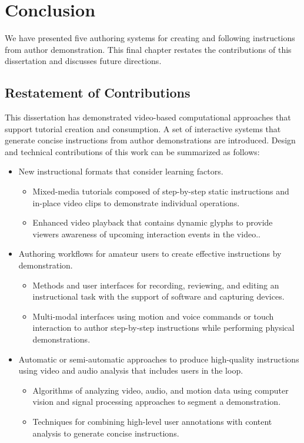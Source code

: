 \chapter{Conclusion}
\label{chapter_conclusion}

We have presented five authoring systems for creating and following instructions from author demonstration. This final chapter restates the contributions of this dissertation and discusses future directions.

\section{Restatement of Contributions}
This dissertation has demonstrated video-based computational approaches that support tutorial creation and consumption. A set of interactive systems that generate concise instructions from author demonstrations are introduced. Design and technical contributions of this work can be summarized as follows:

\begin{itemize}
  \item New instructional formats that consider learning factors.
    \begin{itemize}
      \item Mixed-media tutorials composed of step-by-step static instructions and in-place video clips to demonstrate individual operations.
      \item Enhanced video playback that contains dynamic glyphs to provide viewers awareness of upcoming interaction events in the video..
    \end{itemize}
  \item Authoring workflows for amateur users to create effective instructions by demonstration.
    \begin{itemize}
      \item Methods and user interfaces for recording, reviewing, and editing an instructional task with the support of software and capturing devices.
      \item Multi-modal interfaces using motion and voice commands or touch interaction to author step-by-step instructions while performing physical demonstrations.
    \end{itemize}
  \item Automatic or semi-automatic approaches to produce high-quality instructions using video and audio analysis that includes users in the loop.
    \begin{itemize}
      \item Algorithms of analyzing video, audio, and motion data using computer vision and signal processing approaches to segment a demonstration.
      \item Techniques for combining high-level user annotations with content analysis to generate concise instructions.
    \end{itemize}
\end{itemize}

